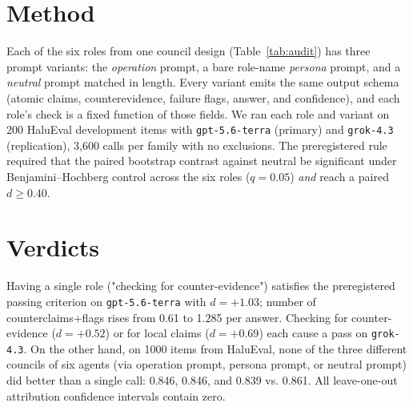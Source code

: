 \documentclass[11pt,a4paper]{article}
\begin{document}
\section{Method}
Each of the six roles from one council design (Table~\ref{tab:audit}) has three
prompt variants: the
\emph{operation} prompt, a bare role-name \emph{persona} prompt, and a
\emph{neutral} prompt matched in length. Every variant emits the same output
schema (atomic claims, counterevidence, failure flags, answer, and confidence),
and each role's check is a fixed function of those fields. We ran each role and
variant on 200 HaluEval development items \mbox{\citep{halueval2023}} with
\texttt{gpt-5.6-terra} (primary) and \texttt{grok-4.3} (replication), 3,600 calls
per family with no exclusions. The preregistered rule required that the paired
bootstrap contrast against neutral be significant under Benjamini--Hochberg
control across the six roles ($q = 0.05$) \emph{and} reach a paired $d \geq 0.40$.

\section{Verdicts}
Having a single role ("checking for counter-evidence") satisfies the preregistered passing criterion on \texttt{gpt-5.6-terra} with $d = +1.03$; number of counterclaims+flags rises from 0.61 to 1.285 per answer. Checking for counter-evidence ($d = +0.52$) or for local claims ($d = +0.69$) each cause a pass on \texttt{grok-4.3}. On the other hand, on 1000 items from HaluEval, none of the three different councils of six agents (via operation prompt, persona prompt, or neutral prompt) did better than a single call: 0.846, 0.846, and 0.839 vs. 0.861. All leave-one-out attribution confidence intervals contain zero.
\end{document}
